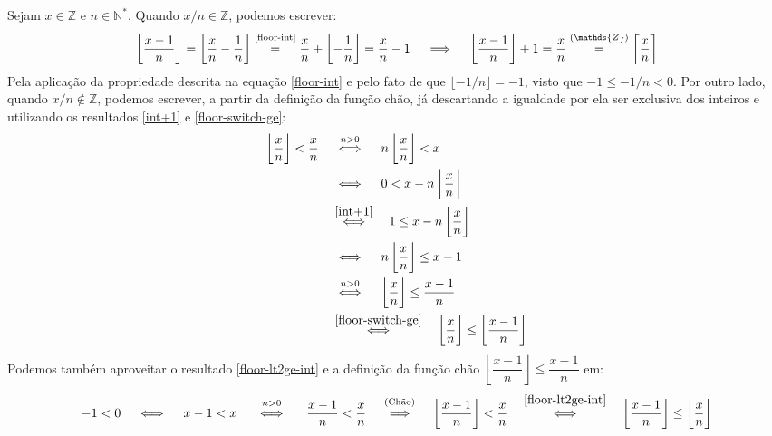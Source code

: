Sejam $x \in \mathds{Z}$ e $n \in \mathds{N}^*$.
Quando $x/n \in \mathds{Z}$, podemos escrever:
\[
    \left\lfloor \dfrac{x - 1}{n} \right\rfloor =
    \left\lfloor \dfrac{x}{n} - \dfrac{1}{n} \right\rfloor
      \stackfirst{\text{\eqref{floor-int}}}{=}
    \dfrac{x}{n} + \left\lfloor - \dfrac{1}{n} \right\rfloor =
    \dfrac{x}{n} - 1
  \quad\implies\quad
    \left\lfloor \dfrac{x - 1}{n} \right\rfloor + 1 =
    \dfrac{x}{n}
      \stackfirst{(\mathds{Z})}{=}
    \left\lceil \dfrac{x\vphantom{l}}{n} \right\rceil
\]
Pela aplicação da propriedade
descrita na equação \eqref{floor-int}
e pelo fato de que $\lfloor -1/n \rfloor = -1$,
visto que $-1 \le -1/n < 0$.
Por outro lado, quando $x/n \notin \mathds{Z}$,
podemos escrever,
a partir da definição da função chão,
já descartando a igualdade por ela ser exclusiva dos inteiros
e utilizando os resultados \eqref{int+1} e \eqref{floor-switch-ge}:
\begin{align*}
    \left\lfloor \dfrac{x\vphantom{l}}{n} \right\rfloor
    < \dfrac{x\vphantom{l}}{n}
  &\quad\stackrel{\rule[-.3em]{0pt}{0pt}n > 0}{\iff}\quad
    n \left\lfloor \dfrac{x\vphantom{l}}{n} \right\rfloor < x
  \\&\quad\iff\quad
    0 < x - n \left\lfloor \dfrac{x\vphantom{l}}{n} \right\rfloor
  \\&\quad\stackrel{\rule[-.3em]{0pt}{0pt}\eqref{int+1}}{\iff}\quad
    1 \le x - n \left\lfloor \dfrac{x\vphantom{l}}{n} \right\rfloor
  \\&\quad\iff\quad
    n \left\lfloor \dfrac{x\vphantom{l}}{n} \right\rfloor \le x - 1
  \\&\quad\stackrel{\rule[-.3em]{0pt}{0pt}n > 0}{\iff}\quad
    \left\lfloor \dfrac{x\vphantom{l}}{n} \right\rfloor
    \le \dfrac{x - 1}{n}
  \\&\quad\stackrel{\rule[-.3em]{0pt}{0pt}\eqref{floor-switch-ge}}{\iff}\quad
    \left\lfloor \dfrac{x\vphantom{l}}{n} \right\rfloor
    \le \left\lfloor \dfrac{x - 1}{n} \right\rfloor
\end{align*}
Podemos também aproveitar o resultado \eqref{floor-lt2ge-int}
e a definição da função chão
$\left\lfloor \dfrac{x - 1}{n} \right\rfloor \le \dfrac{x - 1}{n}$ em:
\[
    -1 < 0
  \quad\iff\quad
    x - 1 < x
  \quad\stackfirst{n > 0}{\iff}\quad
    \dfrac{x - 1}{n} < \dfrac{x}{n}
  \quad\stackfirst{\text{(Chão)}}{\implies}\quad
    \left\lfloor \dfrac{x - 1}{n} \right\rfloor < \dfrac{x}{n}
  \quad\stackfirst{\eqref{floor-lt2ge-int}}{\iff}\quad
    \left\lfloor \dfrac{x - 1}{n} \right\rfloor
    \le \left\lfloor \dfrac{x\vphantom{l}}{n} \right\rfloor
\]
